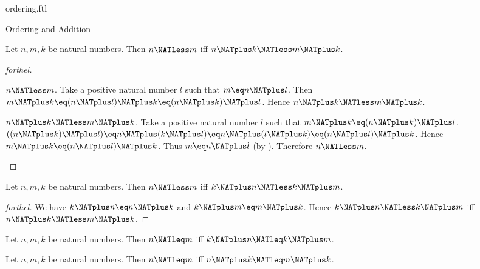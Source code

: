 \documentclass{naproche-library}
\begin{document}
\begin{smodule}[title=The Standard Ordering of the Natural Numbers]{ordering.ftl}
\begin{sfragment}{Ordering and Addition}
  \begin{proposition}[forthel,id=ARITHMETIC_04_7354062662008832]
    Let $n, m, k$ be natural numbers.
    Then $n \NATless m$ iff $n \NATplus k \NATless m \NATplus k$.
  \end{proposition}
  \begin{proof}[forthel]
    \begin{case}{$n \NATless m$.}
      Take a positive natural number $l$ such that $m \eq n \NATplus l$.
      Then $m \NATplus k
        \eq (n \NATplus l) \NATplus k
        \eq (n \NATplus k) \NATplus l$.
      Hence $n \NATplus k \NATless m \NATplus k$.
    \end{case}

    \begin{case}{$n \NATplus k \NATless m \NATplus k$.}
      Take a positive natural number $l$ such that $m \NATplus k \eq (n \NATplus k) \NATplus l$.
      $((n \NATplus k) \NATplus l)
        \eq n \NATplus (k \NATplus l)
        \eq n \NATplus (l \NATplus k)
        \eq (n \NATplus l) \NATplus k$.
      Hence $m \NATplus k \eq (n \NATplus l) \NATplus k$.
      Thus $m \eq n \NATplus l$ (by ).
      Therefore $n \NATless m$.
    \end{case}
  \end{proof}

  \begin{corollary}[forthel,id=ARITHMETIC_04_1901366129721344]
    Let $n, m, k$ be natural numbers.
    Then $n \NATless m$ iff $k \NATplus n \NATless k \NATplus m$.
  \end{corollary}
  \begin{proof}[forthel]
    We have $k \NATplus n \eq n \NATplus k$ and $k \NATplus m \eq m \NATplus k$.
    Hence $k \NATplus n \NATless k \NATplus m$ iff $n \NATplus k \NATless m \NATplus k$.
  \end{proof}

  \begin{corollary}[forthel,id=ARITHMETIC_04_4203390999461888]
    Let $n, m, k$ be natural numbers.
    Then $n \NATleq m$ iff $k \NATplus n \NATleq k \NATplus m$.
  \end{corollary}

  \begin{corollary}[forthel,id=ARITHMETIC_04_5512590832697344]
    Let $n, m, k$ be natural numbers.
    Then $n \NATleq m$ iff $n \NATplus k \NATleq m \NATplus k$.
  \end{corollary}
\end{sfragment}


\end{smodule}
\end{document}
